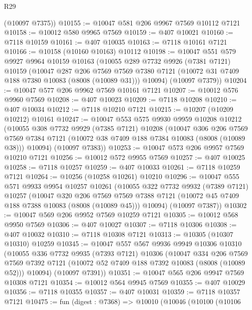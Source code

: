\begin{lexlean}{R29}
\begin{coremodule}
      (@10097 @7375))
@10155 := @10047 @581 @206 @9967 @7569 @10112 @7121
@10158 := @10012 @580 @9965 @7569
@10159 := @407 @10021
@10160 := @7118 @10159
@10161 := @407 @10035
@10163 := @7118 @10161 @7121
@10166 := @10158 (@10160 @10163) @10112
@10198 := @10047
    @551
    @579
    @9927
    @9964
    @10159
    @10163
    (@10055
      @289
      @7732
      @9926
      (@7381 @7121)
      @10159
      (@10047
        @287
        @206
        @7569
        @7569
        @7380
        @7121
        (@10072 @31 @7409 @188 @7380 @10083 (@8008 (@10089 @31)))
        @10094)
      (@10097 @7379))
@10204 := @10047 @577 @206 @9962 @7569 @10161 @7121
@10207 := @10012 @576 @9960 @7569
@10208 := @407 @10023
@10209 := @7118 @10208
@10210 := @407 @10034
@10212 := @7118 @10210 @7121
@10215 := @10207 (@10209 @10212) @10161
@10247 := @10047
    @553
    @575
    @9930
    @9959
    @10208
    @10212
    (@10055
      @308
      @7732
      @9929
      (@7385 @7121)
      @10208
      (@10047
        @306
        @206
        @7569
        @7569
        @7384
        @7121
        (@10072 @38 @7409 @188 @7384 @10083 (@8008 (@10089 @38)))
        @10094)
      (@10097 @7383))
@10253 := @10047 @573 @206 @9957 @7569 @10210 @7121
@10256 := @10012 @572 @9955 @7569
@10257 := @407 @10025
@10258 := @7118 @10257
@10259 := @407 @10033
@10261 := @7118 @10259 @7121
@10264 := @10256 (@10258 @10261) @10210
@10296 := @10047
    @555
    @571
    @9933
    @9954
    @10257
    @10261
    (@10055
      @322
      @7732
      @9932
      (@7389 @7121)
      @10257
      (@10047
        @320
        @206
        @7569
        @7569
        @7388
        @7121
        (@10072 @45 @7409 @188 @7388 @10083 (@8008 (@10089 @45)))
        @10094)
      (@10097 @7387))
@10302 := @10047 @569 @206 @9952 @7569 @10259 @7121
@10305 := @10012 @568 @9950 @7569
@10306 := @407 @10027
@10307 := @7118 @10306
@10308 := @407 @10032
@10310 := @7118 @10308 @7121
@10313 := @10305 (@10307 @10310) @10259
@10345 := @10047
    @557
    @567
    @9936
    @9949
    @10306
    @10310
    (@10055
      @336
      @7732
      @9935
      (@7393 @7121)
      @10306
      (@10047
        @334
        @206
        @7569
        @7569
        @7392
        @7121
        (@10072 @52 @7409 @188 @7392 @10083 (@8008 (@10089 @52)))
        @10094)
      (@10097 @7391))
@10351 := @10047 @565 @206 @9947 @7569 @10308 @7121
@10354 := @10012 @564 @9945 @7569
@10355 := @407 @10029
@10356 := @7118 @10355
@10357 := @407 @10031
@10359 := @7118 @10357 @7121
@10475 := fun (digest : @7368) =>
  @10010
    (@10046
      (@10100
        (@10106

\end{coremodule}
\end{lexlean}
